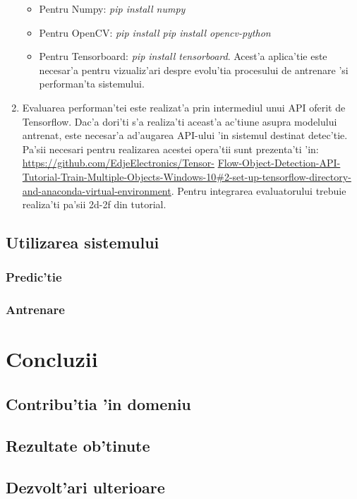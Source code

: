 \documentclass[12pt,a4paper,twoside]{report}
\begin{document}
\begin{enumerate}
\begin{itemize}
\item Pentru Numpy: \textit{pip install numpy}
\item Pentru OpenCV: \textit{pip install pip
 install opencv-python}
\item Pentru Tensorboard: \textit{pip install tensorboard}. Acest'a aplica'tie este necesar'a pentru vizualiz'ari despre evolu'tia procesului de antrenare 'si performan'ta sistemului.
\end{itemize}
\item Evaluarea performan'tei este realizat'a prin intermediul unui API oferit de Tensorflow. Dac'a dori'ti s'a realiza'ti aceast'a ac'tiune asupra modelului antrenat, este necesar'a ad'augarea API-ului 'in sistemul destinat detec'tie. Pa'sii necesari pentru realizarea acestei opera'tii sunt prezenta'ti 'in: \url{https://github.com/EdjeElectronics/Tensor-} \url{Flow-Object-Detection-API-Tutorial-Train-Multiple-Objects-Windows-10#2-set-up-tensorflow-directory-and-anaconda-virtual-environment}. Pentru integrarea evaluatorului trebuie realiza'ti pa'sii 2d-2f din tutorial.
\end{enumerate}

\section{Utilizarea sistemului} 
\subsection{Predic'tie}
\subsection{Antrenare}
 
 
\chapter{Concluzii}
\section{Contribu'tia 'in domeniu}
\section{Rezultate ob'tinute}
\section{Dezvolt'ari ulterioare}
\end{document}
